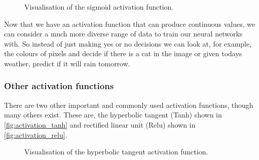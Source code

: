 \begin{figure}
\begin{center}
\caption{Visualisation of the sigmoid activation function.}
\label{fig:activation_sigmoid}
\end{center}
\end{figure}

Now that we have an activation function that can produce continuous values, we can consider a much more diverse range of data to train our neural networks with. So instead of just making yes or no decisions we can look at, for example, the colours of pixels and decide if there is a cat in the image or given todays weather, predict if it will rain tomorrow.

\subsubsection{Other activation functions}
There are two other important and commonly used activation functions, though many others exist. These are, the hyperbolic tangent (Tanh) shown in \autoref{fig:activation_tanh} and rectified linear unit (Relu)  shown in \autoref{fig:activation_relu}.

\begin{figure}
\begin{center}
\caption{Visualisation of the hyperbolic tangent activation function.}
\label{fig:activation_tanh}
\end{center}
\end{figure}

